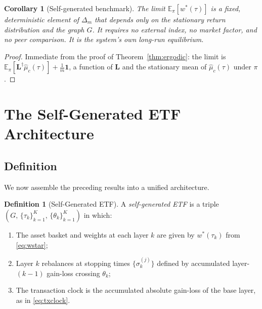 \documentclass[twocolumn,11pt,a4paper]{article}
\theoremstyle{plain}
\newtheorem{corollary}[theorem]{Corollary}
\theoremstyle{definition}
\newtheorem{definition}[theorem]{Definition}
\theoremstyle{remark}
\newcommand{\E}{\mathbb{E}}
\newcommand{\Lop}{\mathbf{L}}        %
\newcommand{\Lpinv}{\mathbf{L}^{\dagger}} %
\newcommand{\wstar}{w^{*}}
\newcommand{\Deltam}{\Delta_m}
\newcommand{\one}{\mathbf{1}}
\begin{document}
\begin{corollary}[Self-generated benchmark]
  \label{cor:self_benchmark}
  The limit $\E_\pi[\wstar(\tau)]$ is a fixed, deterministic element
  of $\Deltam$ that depends only on the stationary return distribution
  and the graph $G$.  It requires no external index, no market factor,
  and no peer comparison.  It is the system's own long-run equilibrium.
\end{corollary}

\begin{proof}
  Immediate from the proof of Theorem~\ref{thm:ergodic}: the limit
  is $\E_\pi[\Lpinv\hat\mu_c(\tau)]+\frac{1}{m}\one$, a function of
  $\Lop$ and the stationary mean of $\hat\mu_c(\tau)$ under $\pi$.
\end{proof}

\section{The Self-Generated ETF Architecture}
\label{sec:self_generated}

\subsection{Definition}
\label{sec:sgETF_def}

We now assemble the preceding results into a unified architecture.

\begin{definition}[Self-Generated ETF]
  \label{def:sgETF}
  A \emph{self-generated ETF} is a triple
  $(G,\,\{\tau_k\}_{k=1}^K,\,\{\theta_k\}_{k=1}^K)$ in which:
  \begin{enumerate}[label=(\roman*)]
    \item The asset basket and weights at each layer $k$ are given by
          $\wstar(\tau_k)$ from \eqref{eq:wstar};
    \item Layer $k$ rebalances at stopping times $\{\sigma_k^{(j)}\}$
          defined by accumulated layer-$(k-1)$ gain-loss
          crossing $\theta_k$;
    \item The transaction clock is the accumulated absolute gain-loss
          of the base layer, as in \eqref{eq:txclock}.
  \end{enumerate}
\end{definition}
\end{document}
